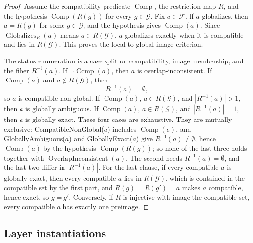 \begin{proof}
Assume the compatibility predicate \(\operatorname{Comp}\), the
restriction map \(R\), and the hypothesis
\(\operatorname{Comp}(R(g))\) for every \(g\in\mathcal G\).  Fix
\(a\in\mathcal F\).  If \(a\) globalizes, then \(a=R(g)\) for some
\(g\in\mathcal G\), and the hypothesis gives \(\operatorname{Comp}(a)\).
Since \(\operatorname{Globalizes}_R(a)\) means \(a\in R(\mathcal G)\), \(a\)
globalizes exactly when it is compatible and lies in \(R(\mathcal G)\). This
proves the local-to-global image criterion.

The status enumeration is a case split on compatibility, image
membership, and the fiber \(R^{-1}(a)\).  If
\(\neg\operatorname{Comp}(a)\), then \(a\) is overlap-inconsistent.
If \(\operatorname{Comp}(a)\) and \(a\notin R(\mathcal G)\), then
\[
  R^{-1}(a)=\emptyset,
\]
so \(a\) is compatible non-global.  If
\(\operatorname{Comp}(a)\), \(a\in R(\mathcal G)\), and
\(|R^{-1}(a)|>1\), then \(a\) is globally ambiguous.  If
\(\operatorname{Comp}(a)\), \(a\in R(\mathcal G)\), and
\(|R^{-1}(a)|=1\), then \(a\) is globally exact.  These four cases
are exhaustive. They are mutually exclusive: CompatibleNonGlobal(\(a\)) includes \(\operatorname{Comp}(a)\), and GloballyAmbiguous(\(a\)) and GloballyExact(\(a\)) give \(R^{-1}(a)\ne\emptyset\), hence \(\operatorname{Comp}(a)\) by the hypothesis \(\operatorname{Comp}(R(g))\); so none of the last three holds together with \(\operatorname{OverlapInconsistent}(a)\). The second needs
\(R^{-1}(a)=\emptyset\), and the last two differ in \(|R^{-1}(a)|\).
For the last clause, if every compatible \(a\) is globally exact, then every
compatible \(a\) lies in \(R(\mathcal G)\), which is contained in the compatible
set by the first part, and \(R(g)=R(g')=a\) makes \(a\) compatible, hence
exact, so \(g=g'\). Conversely, if \(R\) is injective with image the compatible
set, every compatible \(a\) has exactly one preimage.
\end{proof}

\subsection*{Layer instantiations}\label{layer-inst:F4}

